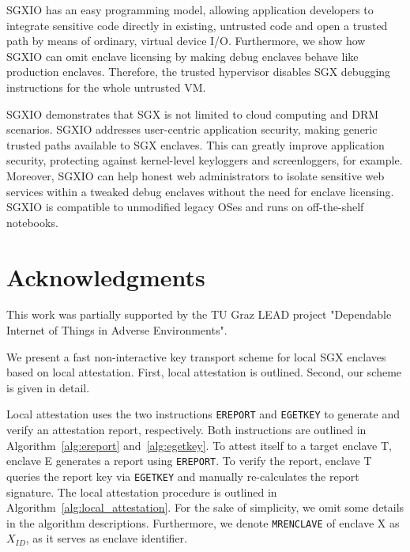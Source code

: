 \documentclass{sig-alternate-05-2015}
\begin{document}
SGXIO has an easy programming model, allowing application developers to integrate sensitive code directly in existing, untrusted code and open a trusted path by means of ordinary, virtual device I/O. 
Furthermore, we show how SGXIO can omit enclave licensing by making debug enclaves behave like production enclaves. 
Therefore, the trusted hypervisor disables SGX debugging instructions for the whole untrusted VM. 

SGXIO demonstrates that SGX is not limited to cloud computing and DRM scenarios. 
SGXIO addresses user-centric application security, making generic trusted paths available to SGX enclaves. 
This can greatly improve application security, protecting against kernel-level keyloggers and screenloggers, for example. 
Moreover, SGXIO can help honest web administrators to isolate sensitive web services within a tweaked debug enclaves without the need for enclave licensing. 
SGXIO is compatible to unmodified legacy OSes and runs on off-the-shelf notebooks. 



\section*{Acknowledgments}
This work was partially supported by the TU Graz LEAD project "Dependable Internet of Things in Adverse Environments".


%
%

%
%




\appendix\label{sec:appendix}

\balance

We present a fast non-interactive key transport scheme for local SGX enclaves based on local attestation. 
First, local attestation is outlined. 
Second, our scheme is given in detail.

Local attestation uses the two instructions \verb!EREPORT! and \verb!EGETKEY! to generate and verify an attestation report, respectively. 
Both instructions are outlined in Algorithm~\ref{alg:ereport} and~\ref{alg:egetkey}. 
To attest itself to a target enclave T, enclave E generates a report using \verb!EREPORT!. 
To verify the report, enclave T queries the report key via \verb!EGETKEY! and manually re-calculates the report signature. 
The local attestation procedure is outlined in Algorithm~\ref{alg:local_attestation}. 
For the sake of simplicity, we omit some details in the algorithm descriptions. 
Furthermore, we denote \verb!MRENCLAVE! of enclave X as $X_{ID}$, as it serves as enclave identifier.
\end{document}

